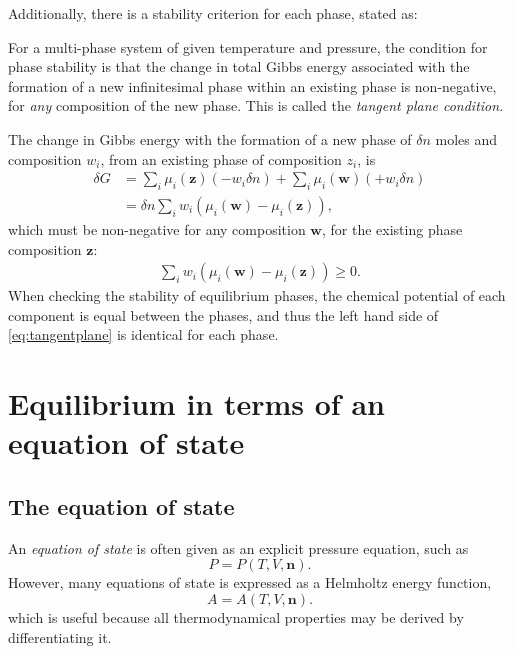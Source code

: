 \documentclass[internal,english]{sintefmemo2012}
\newcommand*{\vektor}[1]{\boldsymbol{#1}}%
\begin{document}
Additionally, there is a stability criterion for each phase, stated as:
\begin{framed}
  \noindent
  For a multi-phase system of given temperature and pressure, the condition for phase stability is that the change in total Gibbs energy associated with 
  the formation of a new infinitesimal phase within an existing phase is non-negative, for \textit{any} composition of the new phase. 
  This is called the \textit{tangent plane condition}.
\end{framed}
The change in Gibbs energy with the formation of a new phase of $\delta n$ moles and composition $w_i$, from an existing phase of composition $z_i$, is
\begin{align}
  \delta G 
  &= \sum_i \mu_i(\vektor{z})\left( - w_i \delta n \right) + \sum_i \mu_i(\vektor{w})\left( + w_i \delta n \right) \nonumber\\
  &= \delta n \sum_i w_i \left( \mu_i(\vektor{w}) - \mu_i(\vektor{z}) \right), 
  \label{}
\end{align}
which must be non-negative for any composition $\vektor{w}$, for the existing phase composition $\vektor{z}$:
\begin{align}
  \sum_i w_i \left( \mu_i(\vektor{w}) - \mu_i(\vektor{z}) \right) \geq 0.
  \label{eq:tangentplane}
\end{align}
When checking the stability of equilibrium phases, the chemical potential of each component is equal between the phases, and thus the left hand side of 
\eqref{eq:tangentplane} is identical for each phase.



\section{Equilibrium in terms of an equation of state}
\subsection{The equation of state}
An \textit{equation of state} is often given as an explicit pressure equation, such as 
\begin{equation}
  P = P (T,V,\vektor{n}).
  \label{}
\end{equation}
However, many equations of state is expressed as a Helmholtz energy
function, 
\begin{equation}
  A = A(T,V,\vektor{n}).
  \label{}
\end{equation}
which is useful because all thermodynamical properties
may be derived by differentiating it.
\end{document}
